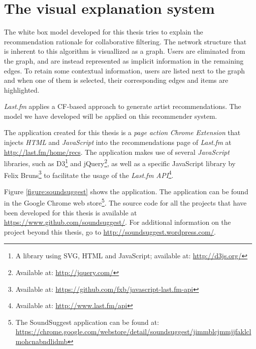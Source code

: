 \section{The visual explanation system}\label{chapter:introduction:section:application}

The white box model developed for this thesis tries to explain the recommendation rationale for collaborative filtering. The network structure that is inherent to this algorithm is visuallized as a graph. Users are eliminated from the graph, and are instead represented as implicit information in the remaining edges. To retain some contextual information, users are listed next to the graph and when one of them is selected, their corresponding edges and items are highlighted.

\emph{Last.fm} applies a CF-based approach to generate artist recommendations\cite{lastfm:2012:home, levy:2010, wikipedia:2013:lastfm}. The model we have developed will be applied on this recommender system.

The application created for this thesis is a \emph{page action} \emph{Chrome Extension} that injects \emph{HTML} and \emph{JavaScript} into the recommendations page of \emph{Last.fm} at \url{http://last.fm/home/recs}. The application makes use of several \emph{JavaScript} libraries, such as D3\footnote{A library using SVG, HTML and JavaScript\cite{bostock:2012:d3js}; available at: \url{http://d3js.org/}} and jQuery\footnote{Available at: \url{http://jquery.com/}}, as well as a specific JavaScript library by Felix Bruns\footnote{Available at: \url{https://github.com/fxb/javascript-last.fm-api}} to facilitate the usage of the \emph{Last.fm API}\footnote{Available at: \url{http://www.last.fm/api}}.

Figure \ref{figure:soundsuggest} shows the application. The application can be found in the Google Chrome web store\footnote{The SoundSuggest application can be found at: \url{https://chrome.google.com/webstore/detail/soundsuggest/jimmblcjmmjjfaklclmohcnabndlidmb}}. The source code for all the projects that have been developed for this thesis is available at \url{https://www.github.com/soundsuggest/}. For additional information on the project beyond this thesis, go to \url{http://soundsuggest.wordpress.com/}.

